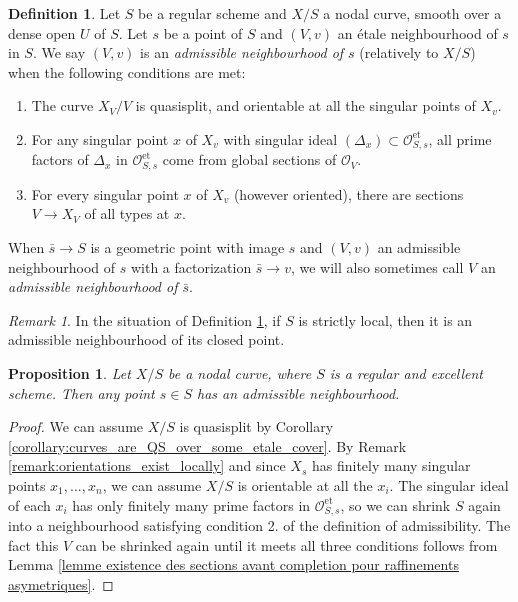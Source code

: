 \documentclass[a4paper,10pt,twoside]{article}
\newcommand{\on}[1]{\operatorname{#1}}
\renewcommand{\O}{\mathcal{O}}
\newtheorem{prop}[thm]{Proposition}
\theoremstyle{definition}
\newtheorem{defi}[thm]{Definition}
\theoremstyle{remark}
\newtheorem{rem}{Remark}[thm]
\renewcommand{\on}[1]{\operatorname{#1}}
\begin{document}
\begin{defi}\label{definition:admissible}
Let $S$ be a regular scheme and $X/S$ a nodal curve, smooth over a dense open $U$ of $S$. Let $s$ be a point of $S$ and $(V,v)$ an \'etale neighbourhood of $s$ in $S$. We say $(V,v)$ is an \emph{admissible neighbourhood of $s$} (relatively to $X/S$) when the following conditions are met:
\begin{enumerate}
\item The curve $X_V/V$ is quasisplit, and orientable at all the singular points of $X_v$.
\item For any singular point $x$ of $X_v$ with singular ideal $(\Delta_x)\subset\O_{S,s}^{\on{et}}$, all prime factors of $\Delta_x$ in $\O_{S,s}^{\on{et}}$ come from global sections of $\O_V$.
\item For every singular point $x$ of $X_v$ (however oriented), there are sections $V\to X_V$ of all types at $x$.
\end{enumerate}
When $\bar s \to S$ is a geometric point with image $s$ and $(V,v)$ an admissible neighbourhood of $s$ with a factorization $\bar s \to v$, we will also sometimes call $V$ an \emph{admissible neighbourhood of $\bar s$}.
\end{defi}

\begin{rem}\label{remark:strictly_local_schemes_are_admissible}
In the situation of Definition \ref{definition:admissible}, if $S$ is strictly local, then it is an admissible neighbourhood of its closed point.
\end{rem}


\begin{prop}\label{proposition:admissibles_are_a_basis}
Let $X/S$ be a nodal curve, where $S$ is a regular and excellent scheme. Then any point $s\in S$ has an admissible neighbourhood.
\end{prop}

\begin{proof}
We can assume $X/S$ is quasisplit by Corollary \ref{corollary:curves_are_QS_over_some_etale_cover}. By Remark \ref{remark:orientations_exist_locally} and since $X_s$ has finitely many singular points $x_1,...,x_n$, we can assume $X/S$ is orientable at all the $x_i$. The singular ideal of each $x_i$ has only finitely many prime factors in $\O_{S,s}^{\on{et}}$, so we can shrink $S$ again into a neighbourhood satisfying condition 2. of the definition of admissibility. The fact this $V$ can be shrinked again until it meets all three conditions follows from Lemma \ref{lemme existence des sections avant completion pour raffinements asymetriques}.
\end{proof}
\end{document}

